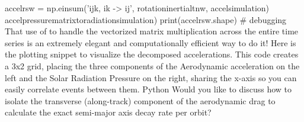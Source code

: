 {}
\markdownRendererSectionEnd \markdownRendererSectionBegin
{}\markdownRendererInterblockSeparator
{}
\markdownRendererSectionEnd \markdownRendererSectionBegin
{}\markdownRendererInterblockSeparator
{}accelrsw = np.einsum('ijk, ik -> ij', rotationinertialtnw, accelsimulation) accelpressurematrixtoradiationsimulation) print(accelrsw.shape) # debugging\markdownRendererInterblockSeparator
{}\markdownRendererSectionBegin
{}\markdownRendererInterblockSeparator
{}That use of  to handle the vectorized matrix multiplication across the entire time series is an extremely elegant and computationally efficient way to do it!\markdownRendererInterblockSeparator
{}Here is the plotting snippet to visualize the decomposed accelerations. This code creates a 3x2 grid, placing the three components of the Aerodynamic acceleration on the left and the Solar Radiation Pressure on the right, sharing the x-axis so you can easily correlate events between them.\markdownRendererInterblockSeparator
{}\markdownRendererInterblockSeparator
{}Python\markdownRendererInterblockSeparator
{}\markdownRendererInterblockSeparator
{}Would you like to discuss how to isolate the transverse (along-track) component of the aerodynamic drag to calculate the exact semi-major axis decay rate per orbit?\markdownRendererInterblockSeparator
{}\markdownRendererThematicBreak{}\markdownRendererInterblockSeparator
{}
\markdownRendererSectionEnd \markdownRendererSectionBegin
{}\markdownRendererInterblockSeparator
